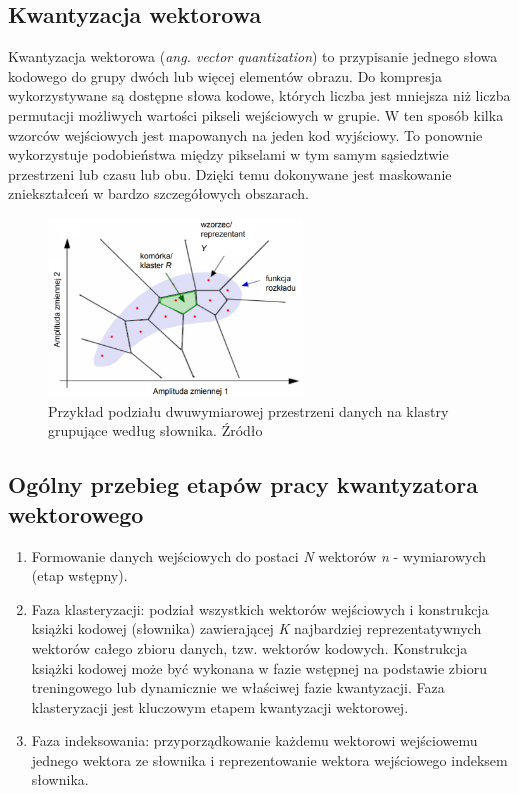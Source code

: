\documentclass{article}
\begin{document}
\subsection{Kwantyzacja wektorowa}
Kwantyzacja wektorowa (\textit{ang. vector quantization}) to przypisanie jednego słowa kodowego do grupy dwóch lub więcej elementów obrazu. Do kompresja wykorzystywane są dostępne słowa kodowe, których liczba jest mniejsza niż liczba permutacji możliwych wartości pikseli wejściowych w grupie. W ten sposób kilka wzorców wejściowych jest mapowanych na jeden kod wyjściowy. To ponownie wykorzystuje podobieństwa między pikselami w tym samym sąsiedztwie przestrzeni lub czasu lub obu. Dzięki temu dokonywane jest maskowanie zniekształceń w bardzo szczegółowych obszarach.
\begin{figure}[H]
    \centering
    \includegraphics[width=0.6\textwidth]{images/kwantyzacja_wektorowa.png}
    \caption{Przykład podziału dwuwymiarowej przestrzeni danych na klastry grupujące według słownika. Źródło \cite{mwilczewski}}
    \label{fig:crossing}
\end{figure}

\subsection{Ogólny przebieg etapów pracy kwantyzatora wektorowego}

\begin{enumerate}
  \item Formowanie danych wejściowych do postaci \textit{N} wektorów \textit{n} - wymiarowych (etap wstępny). 
  \item Faza klasteryzacji: podział wszystkich wektorów wejściowych i konstrukcja książki kodowej (słownika) zawierającej \textit{K} najbardziej reprezentatywnych wektorów całego zbioru danych, tzw. wektorów kodowych. Konstrukcja książki kodowej może być wykonana w fazie wstępnej na podstawie zbioru treningowego lub dynamicznie we właściwej fazie kwantyzacji. Faza klasteryzacji jest kluczowym etapem kwantyzacji wektorowej.
  \item Faza indeksowania: przyporządkowanie każdemu wektorowi wejściowemu jednego wektora ze słownika i reprezentowanie wektora wejściowego indeksem słownika. 
\end{enumerate}
\end{document}
